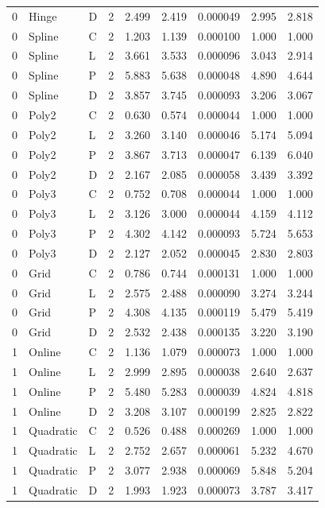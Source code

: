 \begin{longtable}{lllrrrrrr}
0 & Hinge & D & 2 & 2.499 & 2.419 & 0.000049 & 2.995 & 2.818 \\
0 & Spline & C & 2 & 1.203 & 1.139 & 0.000100 & 1.000 & 1.000 \\
0 & Spline & L & 2 & 3.661 & 3.533 & 0.000096 & 3.043 & 2.914 \\
0 & Spline & P & 2 & 5.883 & 5.638 & 0.000048 & 4.890 & 4.644 \\
0 & Spline & D & 2 & 3.857 & 3.745 & 0.000093 & 3.206 & 3.067 \\
0 & Poly2 & C & 2 & 0.630 & 0.574 & 0.000044 & 1.000 & 1.000 \\
0 & Poly2 & L & 2 & 3.260 & 3.140 & 0.000046 & 5.174 & 5.094 \\
0 & Poly2 & P & 2 & 3.867 & 3.713 & 0.000047 & 6.139 & 6.040 \\
0 & Poly2 & D & 2 & 2.167 & 2.085 & 0.000058 & 3.439 & 3.392 \\
0 & Poly3 & C & 2 & 0.752 & 0.708 & 0.000044 & 1.000 & 1.000 \\
0 & Poly3 & L & 2 & 3.126 & 3.000 & 0.000044 & 4.159 & 4.112 \\
0 & Poly3 & P & 2 & 4.302 & 4.142 & 0.000093 & 5.724 & 5.653 \\
0 & Poly3 & D & 2 & 2.127 & 2.052 & 0.000045 & 2.830 & 2.803 \\
0 & Grid & C & 2 & 0.786 & 0.744 & 0.000131 & 1.000 & 1.000 \\
0 & Grid & L & 2 & 2.575 & 2.488 & 0.000090 & 3.274 & 3.244 \\
0 & Grid & P & 2 & 4.308 & 4.135 & 0.000119 & 5.479 & 5.419 \\
0 & Grid & D & 2 & 2.532 & 2.438 & 0.000135 & 3.220 & 3.190 \\
1 & Online & C & 2 & 1.136 & 1.079 & 0.000073 & 1.000 & 1.000 \\
1 & Online & L & 2 & 2.999 & 2.895 & 0.000038 & 2.640 & 2.637 \\
1 & Online & P & 2 & 5.480 & 5.283 & 0.000039 & 4.824 & 4.818 \\
1 & Online & D & 2 & 3.208 & 3.107 & 0.000199 & 2.825 & 2.822 \\
1 & Quadratic & C & 2 & 0.526 & 0.488 & 0.000269 & 1.000 & 1.000 \\
1 & Quadratic & L & 2 & 2.752 & 2.657 & 0.000061 & 5.232 & 4.670 \\
1 & Quadratic & P & 2 & 3.077 & 2.938 & 0.000069 & 5.848 & 5.204 \\
1 & Quadratic & D & 2 & 1.993 & 1.923 & 0.000073 & 3.787 & 3.417 \\

\end{longtable}
